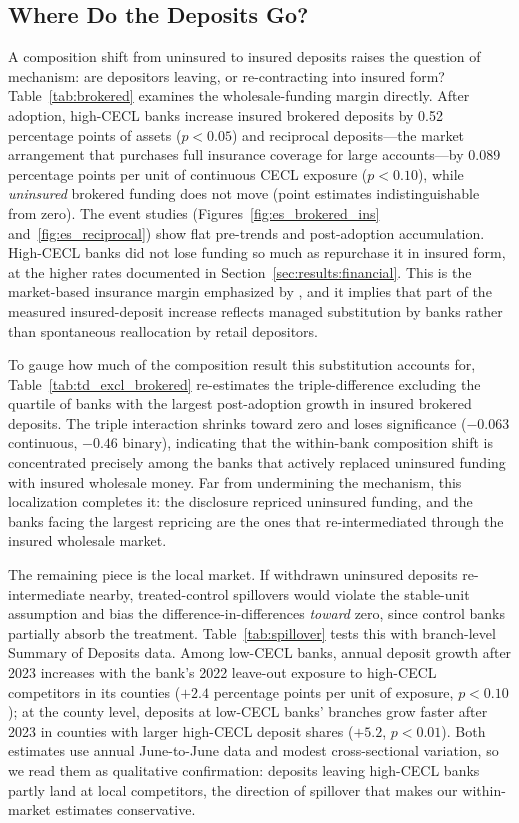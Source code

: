 \subsection{Where Do the Deposits Go?}
\label{sec:robustness:destination}

A composition shift from uninsured to insured deposits raises the question
of mechanism: are depositors leaving, or re-contracting into insured form?
Table~\ref{tab:brokered} examines the wholesale-funding margin directly.
After adoption, high-CECL banks increase insured brokered deposits by 0.52
percentage points of assets ($p < 0.05$) and reciprocal deposits---the
market arrangement that purchases full insurance coverage for large
accounts---by 0.089 percentage points per unit of continuous CECL exposure
($p < 0.10$), while \emph{uninsured} brokered funding does not move (point
estimates indistinguishable from zero).  The event studies
(Figures~\ref{fig:es_brokered_ins} and~\ref{fig:es_reciprocal}) show flat
pre-trends and post-adoption accumulation.  High-CECL banks did not lose
funding so much as repurchase it in insured form, at the higher rates
documented in Section~\ref{sec:results:financial}.  This is the
market-based insurance margin emphasized by \citet{kim2024insurance}, and
it implies that part of the measured insured-deposit increase reflects
managed substitution by banks rather than spontaneous reallocation by retail
depositors.

To gauge how much of the composition result this substitution accounts for,
Table~\ref{tab:td_excl_brokered} re-estimates the triple-difference
excluding the quartile of banks with the largest post-adoption growth in
insured brokered deposits.  The triple interaction shrinks toward zero and
loses significance ($-0.063$ continuous, $-0.46$ binary), indicating that
the within-bank composition shift is concentrated precisely among the banks
that actively replaced uninsured funding with insured wholesale money.  Far
from undermining the mechanism, this localization completes it: the
disclosure repriced uninsured funding, and the banks facing the largest
repricing are the ones that re-intermediated through the insured wholesale
market.

The remaining piece is the local market.  If withdrawn uninsured deposits
re-intermediate nearby, treated-control spillovers would violate the
stable-unit assumption and bias the difference-in-differences \emph{toward}
zero, since control banks partially absorb the treatment.
Table~\ref{tab:spillover} tests this with branch-level Summary of Deposits
data.  Among low-CECL banks, annual deposit growth after 2023 increases
with the bank's 2022 leave-out exposure to high-CECL competitors in its
counties ($+2.4$ percentage points per unit of exposure, $p < 0.10$); at
the county level, deposits at low-CECL banks' branches grow faster after
2023 in counties with larger high-CECL deposit shares ($+5.2$, $p < 0.01$).
Both estimates use annual June-to-June data and modest cross-sectional
variation, so we read them as qualitative confirmation: deposits leaving
high-CECL banks partly land at local competitors, the direction of
spillover that makes our within-market estimates conservative.

